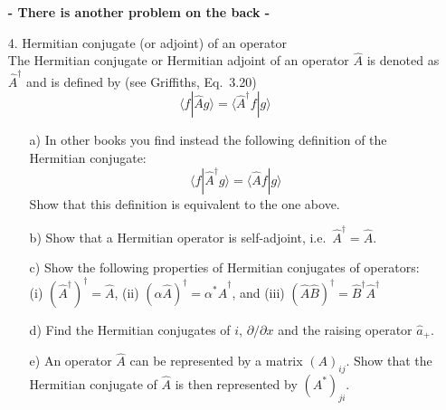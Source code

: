 \documentclass[11pt]{article}
\begin{document}
\begin{itemize}
\begin{itemize}
\end{itemize}
%
\centerline{\bf - There is another problem on the back -}
\newpage
%
\item[4.] Hermitian conjugate (or adjoint) of an operator\\
The Hermitian conjugate or Hermitian adjoint of an operator ${\hat A}$ is denoted as ${\hat A}^\dagger$ and 
is defined by (see Griffiths, Eq.\ 3.20)
\begin{displaymath}
\langle f | {\hat A}g \rangle = \langle {\hat A}^\dagger f | g\rangle
\end{displaymath}
\begin{itemize}
\item[a)]
In other books you find instead the following definition of the Hermitian conjugate:
\begin{displaymath}
\langle f | {\hat A}^\dagger g \rangle = \langle {\hat A} f | g\rangle
\end{displaymath}
Show that this definition is equivalent to the one above.
\item[b)]
Show that a Hermitian operator is self-adjoint, i.e.\ ${\hat A}^\dagger = {\hat A}$.
\item[c)]
Show the following properties of Hermitian conjugates of operators:\\
(i) $\left( {\hat A}^\dagger \right)^{\dagger} = {\hat A}$, 
(ii) $\left( \alpha {\hat A} \right)^\dagger = \alpha^* {\hat A}^\dagger$, and 
(iii) $\left({\hat A}{\hat B}\right)^\dagger = {\hat B}^\dagger {\hat A}^\dagger$
\item[d)]
Find the Hermitian conjugates of $i$, $\partial/\partial x$ and the raising operator ${\hat a}_+$.
\item[e)]
An operator ${\hat A}$ can be represented by a matrix $(A)_{ij}$. Show that the Hermitian conjugate of ${\hat A}$ is then represented by $(A^*)_{ji}$.
\end{itemize}
%
\end{itemize}
\end{document}
